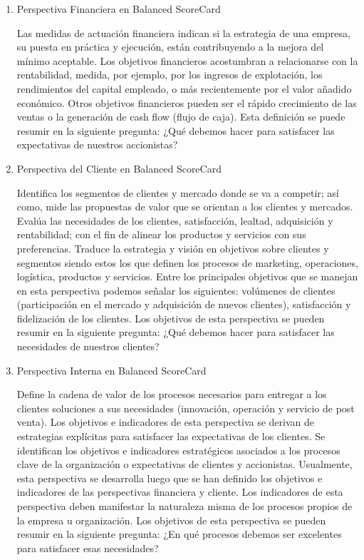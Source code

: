 \begin{enumerate}[a)]
		\begin{enumerate}[1.]
   		 \item Perspectiva Financiera en Balanced ScoreCard

		Las medidas de actuación financiera indican si la estrategia de una empresa, su puesta en práctica y ejecución, están contribuyendo a la mejora del mínimo aceptable. Los objetivos financieros acostumbran a relacionarse con la rentabilidad, medida, por ejemplo, por los ingresos de explotación, los rendimientos del capital empleado, o más recientemente por el valor añadido económico. Otros objetivos financieros pueden ser el rápido crecimiento de las ventas o la generación de cash flow (flujo de caja). Esta definición se puede resumir en la siguiente pregunta: ¿Qué debemos hacer para satisfacer las expectativas de nuestros accionistas?

  		 \item Perspectiva del Cliente en Balanced ScoreCard

		Identifica los segmentos de clientes y mercado donde se va a competir; así como, mide las propuestas de valor que se orientan a los clientes y mercados. Evalúa las necesidades de los clientes, satisfacción, lealtad, adquisición y rentabilidad; con el fin de alinear los productos y servicios con sus preferencias. Traduce la estrategia y visión en objetivos sobre clientes y segmentos siendo estos los que definen los procesos de marketing, operaciones, logística, productos y servicios.
Entre los principales objetivos que se manejan en esta perspectiva podemos señalar los siguientes: volúmenes de clientes (participación en el mercado y adquisición de nuevos clientes), satisfacción y fidelización de los clientes. Los objetivos de esta perspectiva se pueden resumir en la siguiente pregunta: ¿Qué debemos hacer para satisfacer las necesidades de nuestros clientes?

  		  \item Perspectiva Interna en Balanced ScoreCard

		Define la cadena de valor de los procesos necesarios para entregar a los clientes soluciones a sus necesidades (innovación, operación y servicio de post venta). Los objetivos e indicadores de esta perspectiva se derivan de estrategias explícitas para satisfacer las expectativas de los clientes.
Se identifican los objetivos e indicadores estratégicos asociados a los procesos clave de la organización o expectativas de clientes y accionistas. Usualmente, esta perspectiva se desarrolla luego que se han definido los objetivos e indicadores de las perspectivas financiera y cliente. Los indicadores de esta perspectiva deben manifestar la naturaleza misma de los procesos propios de la empresa u organización. Los objetivos de esta perspectiva se pueden resumir en la siguiente pregunta: ¿En qué procesos debemos ser excelentes para satisfacer esas necesidades?


\end{enumerate}
\end{enumerate}
